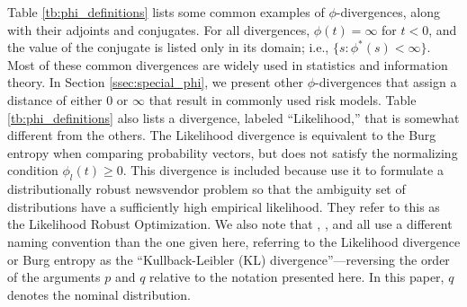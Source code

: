 \documentclass[ijoc,letterpaper]{informs3} %
\begin{document}
Table \ref{tb:phi_definitions} lists some common examples of $\phi$-divergences, along with their adjoints and conjugates.
For all divergences, $\phi(t) = \infty$ for $t < 0$, and the value of the conjugate is listed only in its domain; i.e., $\{s : \phi^*(s) < \infty\}$.
Most of these common divergences are widely used in statistics and information theory.
In Section \ref{ssec:special_phi}, we present other $\phi$-divergences that assign a distance of either $0$ or $\infty$ that result in commonly used risk models.
Table \ref{tb:phi_definitions} also lists a divergence, labeled ``Likelihood,'' that is somewhat different from the others.
The Likelihood divergence is equivalent to the Burg entropy when comparing probability vectors, but does not satisfy the normalizing condition $\phi_l(t) \geq 0$.
This divergence is included because \cite{wang2010likelihood} use it to formulate a distributionally robust newsvendor problem so that the ambiguity set of distributions have a sufficiently high empirical likelihood. 
They refer to this as the Likelihood Robust Optimization. 
We also note that \cite{calafiore2007ambiguous}, \cite{hukullback}, and \cite{wang2010likelihood} all use a different naming convention than the one given here, referring to the Likelihood divergence or Burg entropy as the ``Kullback-Leibler (KL) divergence''---reversing the order of the arguments $p$ and $q$ relative to the notation presented here.
In this paper, $q$ denotes the nominal distribution. 
\end{document}
